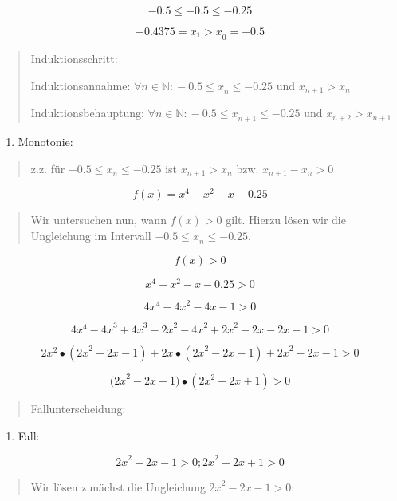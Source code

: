 \documentclass[a4paper, 12pt]{book}
\begin{document}
\[- 0.5 \leq  - 0.5 \leq  - 0.25\]

\[{{- 0.4375 = x}_{1} > x}_{0} =  - 0.5\]

\begin{quote}
Induktionsschritt:

Induktionsannahme:
\(\forall n \in \mathbb{N:} - 0.5{\leq x}_{n} \leq  - 0.25\)
und \(x_{n + 1} > x_{n}\)

Induktionsbehauptung:
\(\forall n \in \mathbb{N:} - 0.5{\leq x}_{n + 1} \leq  - 0.25\)
und \(x_{n + 2} > x_{n + 1}\)
\end{quote}

\begin{enumerate}
\def\labelenumi{\arabic{enumi})}
\item
  Monotonie:
\end{enumerate}

\begin{quote}
z.z. für \(- 0.5{\leq x}_{n} \leq  - 0.25\) ist
\(x_{n + 1} > x_{n}\) bzw. \(x_{n + 1} - {x}_{n} > 0\)
\end{quote}

\[f(x) = x^{4} - x^{2} - x - 0.25\]

\begin{quote}
Wir untersuchen nun, wann \(f(x) > 0\) gilt. Hierzu lösen wir die
Ungleichung im Intervall \(- 0.5{\leq x}_{n} \leq  - 0.25\).
\end{quote}

\[f(x) > 0\]

\[x^{4} - x^{2} - x - 0.25 > 0\]

\[4x^{4} - {4x}^{2} - 4x - 1 > 0\]

\[4x^{4} - {4x}^{3} + {4x}^{3} - {2x}^{2} - {4x}^{2} + {2x}^{2} - 2x - 2x - 1 > 0\]

\[2x^{2} \bullet ({2x}^{2} - 2x - 1) + 2x \bullet ({2x}^{2} - 2x - 1) + {2x}^{2} - 2x - 1 > 0\]

\[{(2x}^{2} - 2x - 1) \bullet ({2x}^{2} + 2x + 1) > 0\]

\begin{quote}
Fallunterscheidung:
\end{quote}

\begin{enumerate}
\def\labelenumi{\arabic{enumi}.}
\item
  Fall:
\end{enumerate}

\[{2x}^{2} - 2x - 1 > 0;{2x}^{2} + 2x + 1 > 0\]

\begin{quote}
Wir lösen zunächst die Ungleichung \({2x}^{2} - 2x - 1 > 0\):
\end{quote}
\end{document}

